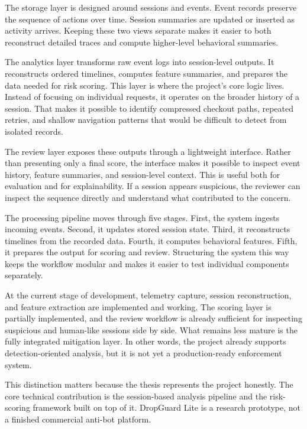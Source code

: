 \documentclass[12pt]{article}
\begin{document}
The storage layer is designed around sessions and events. Event records preserve the sequence of actions over time. Session summaries are updated or inserted as activity arrives. Keeping these two views separate makes it easier to both reconstruct detailed traces and compute higher-level behavioral summaries.

The analytics layer transforms raw event logs into session-level outputs. It reconstructs ordered timelines, computes feature summaries, and prepares the data needed for risk scoring. This layer is where the project’s core logic lives. Instead of focusing on individual requests, it operates on the broader history of a session. That makes it possible to identify compressed checkout paths, repeated retries, and shallow navigation patterns that would be difficult to detect from isolated records.

The review layer exposes these outputs through a lightweight interface. Rather than presenting only a final score, the interface makes it possible to inspect event history, feature summaries, and session-level context. This is useful both for evaluation and for explainability. If a session appears suspicious, the reviewer can inspect the sequence directly and understand what contributed to the concern.

The processing pipeline moves through five stages. First, the system ingests incoming events. Second, it updates stored session state. Third, it reconstructs timelines from the recorded data. Fourth, it computes behavioral features. Fifth, it prepares the output for scoring and review. Structuring the system this way keeps the workflow modular and makes it easier to test individual components separately.

At the current stage of development, telemetry capture, session reconstruction, and feature extraction are implemented and working. The scoring layer is partially implemented, and the review workflow is already sufficient for inspecting suspicious and human-like sessions side by side. What remains less mature is the fully integrated mitigation layer. In other words, the project already supports detection-oriented analysis, but it is not yet a production-ready enforcement system.

This distinction matters because the thesis represents the project honestly. The core technical contribution is the session-based analysis pipeline and the risk-scoring framework built on top of it. DropGuard Lite is a research prototype, not a finished commercial anti-bot platform.
\end{document}
